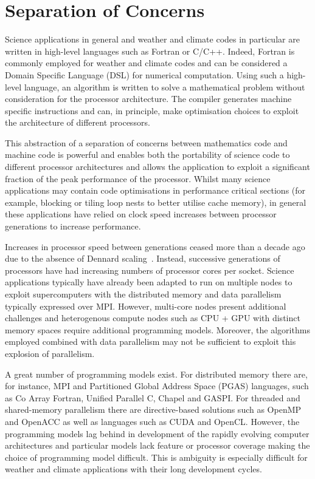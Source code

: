 \documentclass[review,times]{elsarticle}
\begin{document}
\section{\label{sec:SoC}Separation of Concerns}
Science applications in general and weather and climate codes in
particular are written in high-level languages such as Fortran or
C/C++. Indeed, Fortran is commonly employed for weather and climate
codes and can be considered a Domain Specific Language (DSL) for
numerical computation. Using such a high-level language, an
algorithm is written to solve a mathematical problem without
consideration for the processor architecture. The compiler generates
machine specific instructions and can, in principle, make optimisation
choices to exploit the architecture of different processors.

This abstraction of a separation of concerns between mathematics code
and machine code is powerful and enables both the portability of
science code to different processor architectures and allows the
application to exploit a significant fraction of the peak
performance of the processor. Whilst many science applications may
contain code optimisations in performance critical sections (for
example, blocking or tiling loop nests to better utilise cache memory),
in general these applications have relied on clock
speed increases between processor generations to increase performance.

Increases in processor speed between generations ceased more than a decade
ago due to the absence of Dennard scaling~\cite{dennard}. Instead,
successive generations of processors have had increasing numbers of processor cores per
socket. Science applications typically have already been adapted to run on multiple
nodes to exploit supercomputers with the distributed memory and data parallelism
typically expressed over MPI. However, multi-core nodes present
additional challenges and heterogenous compute nodes such as
CPU + GPU with distinct memory spaces require additional programming
models. Moreover, the algorithms employed combined with data
parallelism may not be sufficient to exploit this explosion of parallelism.

A great number of programming models exist. For distributed memory there are, 
for instance, MPI and Partitioned Global Address Space (PGAS) languages, such 
as Co Array Fortran, Unified Parallel C, Chapel and GASPI. For threaded and 
shared-memory parallelism there are directive-based solutions such as OpenMP 
and OpenACC as well as languages such as CUDA and OpenCL. However,
the programming models lag behind in development of the rapidly evolving computer
architectures and particular models lack feature or processor coverage
making the choice of programming model difficult. This is ambiguity is
especially difficult for weather and climate applications with their long development
cycles. 
\end{document}
